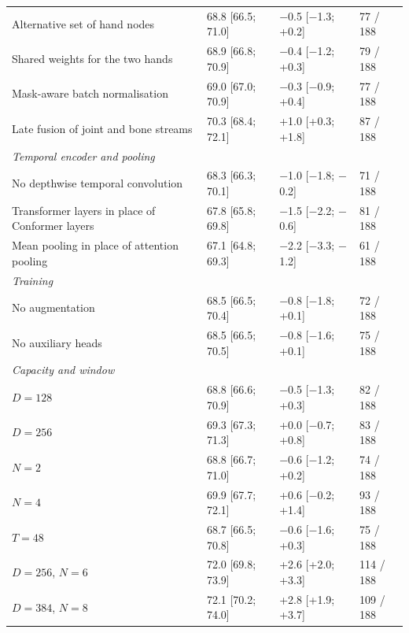 \documentclass[a4paper,10pt]{article}
\begin{document}
\begin{table}[H]
\begin{tabular}{llll}
Alternative set of hand nodes & 68.8 [66.5; 71.0] & $-$0.5 [$-$1.3; +0.2] & 77 / 188 \\
Shared weights for the two hands & 68.9 [66.8; 70.9] & $-$0.4 [$-$1.2; +0.3] & 79 / 188 \\
Mask-aware batch normalisation & 69.0 [67.0; 70.9] & $-$0.3 [$-$0.9; +0.4] & 77 / 188 \\
Late fusion of joint and bone streams & 70.3 [68.4; 72.1] & +1.0 [+0.3; +1.8] & 87 / 188 \\
\multicolumn{4}{l}{\textit{Temporal encoder and pooling}} \\
No depthwise temporal convolution & 68.3 [66.3; 70.1] & $-$1.0 [$-$1.8; $-$0.2] & 71 / 188 \\
Transformer layers in place of Conformer layers & 67.8 [65.8; 69.8] & $-$1.5 [$-$2.2; $-$0.6] & 81 / 188 \\
Mean pooling in place of attention pooling & 67.1 [64.8; 69.3] & $-$2.2 [$-$3.3; $-$1.2] & 61 / 188 \\
\multicolumn{4}{l}{\textit{Training}} \\
No augmentation & 68.5 [66.5; 70.4] & $-$0.8 [$-$1.8; +0.1] & 72 / 188 \\
No auxiliary heads & 68.5 [66.5; 70.5] & $-$0.8 [$-$1.6; +0.1] & 75 / 188 \\
\multicolumn{4}{l}{\textit{Capacity and window}} \\
$D = 128$ & 68.8 [66.6; 70.9] & $-$0.5 [$-$1.3; +0.3] & 82 / 188 \\
$D = 256$ & 69.3 [67.3; 71.3] & +0.0 [$-$0.7; +0.8] & 83 / 188 \\
$N = 2$ & 68.8 [66.7; 71.0] & $-$0.6 [$-$1.2; +0.2] & 74 / 188 \\
$N = 4$ & 69.9 [67.7; 72.1] & +0.6 [$-$0.2; +1.4] & 93 / 188 \\
$T = 48$ & 68.7 [66.5; 70.8] & $-$0.6 [$-$1.6; +0.3] & 75 / 188 \\
$D = 256$, $N = 6$ & 72.0 [69.8; 73.9] & +2.6 [+2.0; +3.3] & 114 / 188 \\
$D = 384$, $N = 8$ & 72.1 [70.2; 74.0] & +2.8 [+1.9; +3.7] & 109 / 188 \\
\bottomrule
\end{tabular}
\end{table}
\end{document}
